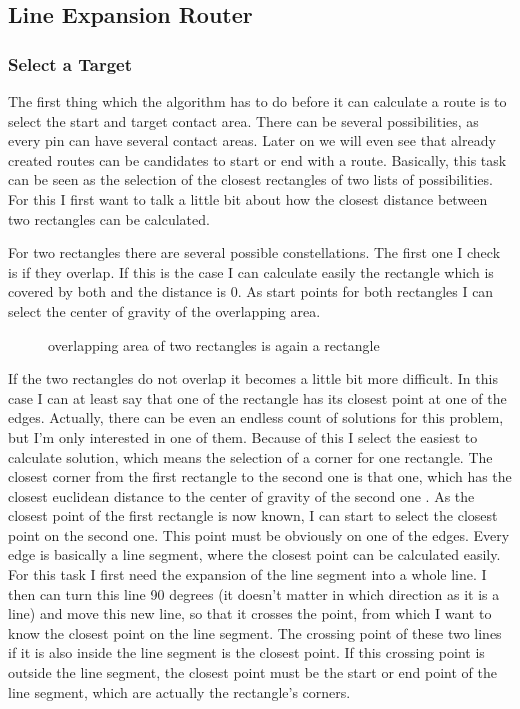 \subsection{Line Expansion Router}

\subsubsection{Select a Target}
The first thing which the algorithm has to do before it can calculate a route is to select the start and target contact area. There can be several possibilities, as every pin can have several contact areas. Later on we will even see that already created routes can be candidates to start or end with a route. Basically, this task can be seen as the selection of the closest rectangles of two lists of possibilities. For this I first want to talk a little bit about how the closest distance between two rectangles can be calculated.

For two rectangles there are several possible constellations. The first one I check is if they overlap. If this is the case I can calculate easily the rectangle which is covered by both  and the distance is 0. As start points for both rectangles I can select the center of gravity of the overlapping area.

\begin{figure}
	\centering
	
  	\caption{overlapping area of two rectangles is again a rectangle}
	\label{fig:rectangles_overlapping}
\end{figure}

If the two rectangles do not overlap it becomes a little bit more difficult. In this case I can at least say that one of the rectangle has its closest point at one of the edges. Actually, there can be even an endless count of solutions for this problem, but I'm only interested in one of them. Because of this I select the easiest to calculate solution, which means the selection of a corner for one rectangle. The closest corner from the first rectangle to the second one is that one, which has the closest euclidean distance to the center of gravity of the second one . As the closest point of the first rectangle is now known, I can start to select the closest point on the second one. This point must be obviously on one of the edges. Every edge is basically a line segment, where the closest point can be calculated easily. For this task I first need the expansion of the line segment into a whole line. I then can turn this line 90 degrees (it doesn't matter in which direction as it is a line) and move this new line, so that it crosses the point, from which I want to know the closest point on the line segment. The crossing point of these two lines if it is also inside the line segment is the closest point. If this crossing point is outside the line segment, the closest point must be the start or end point of the line segment, which are actually the rectangle's corners.

